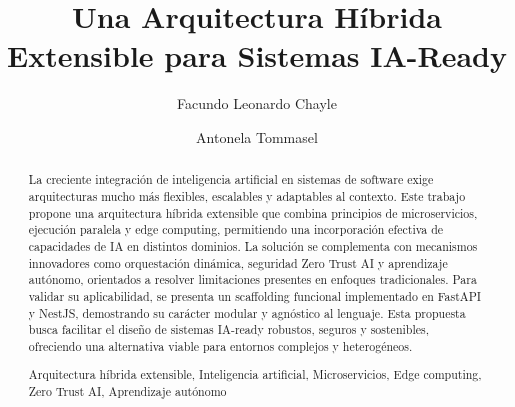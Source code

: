 \documentclass[a4paper]{llncs}
\newcommand{\keywords}[1]{\par\addvspace\baselineskip
\noindent\keywordname\enspace\ignorespaces#1}
\begin{document}
\mainmatter  %

\title{Una Arquitectura Híbrida Extensible para Sistemas IA-Ready}


%
%
\author{Facundo Leonardo Chayle \and Antonela Tommasel}

%


%
%

\maketitle


\begin{abstract}
La creciente integración de inteligencia artificial en sistemas de software exige arquitecturas mucho más flexibles, escalables y adaptables al contexto. Este trabajo propone una arquitectura híbrida extensible que combina principios de microservicios, ejecución paralela y edge computing, permitiendo una incorporación efectiva de capacidades de IA en distintos dominios. La solución se complementa con mecanismos innovadores como orquestación dinámica, seguridad Zero Trust AI y aprendizaje autónomo, orientados a resolver limitaciones presentes en enfoques tradicionales. Para validar su aplicabilidad, se presenta un scaffolding funcional implementado en FastAPI y NestJS, demostrando su carácter modular y agnóstico al lenguaje. Esta propuesta busca facilitar el diseño de sistemas IA-ready robustos, seguros y sostenibles, ofreciendo una alternativa viable para entornos complejos y heterogéneos.
\keywords{Arquitectura híbrida extensible, Inteligencia artificial, Microservicios, Edge computing, Zero Trust AI, Aprendizaje autónomo}
\end{abstract}
\end{document}
